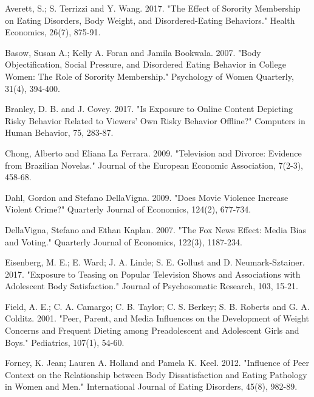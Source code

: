 \documentclass[12pt]{article}
\begin{document}
\begin{thebibliography}{9}
	
	\singlespacing

\item 
Averett, S.; S. Terrizzi and Y. Wang. 2017. "The Effect of Sorority Membership on Eating Disorders, Body Weight, and Disordered-Eating Behaviors." Health Economics, 26(7), 875-91.

\item 
Basow, Susan A.; Kelly A. Foran and Jamila Bookwala. 2007. "Body Objectification, Social Pressure, and Disordered Eating Behavior in College Women: The Role of Sorority Membership." Psychology of Women Quarterly, 31(4), 394-400.

\item 
Branley, D. B. and J. Covey. 2017. "Is Exposure to Online Content Depicting Risky Behavior Related to Viewers' Own Risky Behavior Offline?" Computers in Human Behavior, 75, 283-87.

\item 
Chong, Alberto and Eliana La Ferrara. 2009. "Television and Divorce: Evidence from Brazilian Novelas." Journal of the European Economic Association, 7(2-3), 458-68.

\item 
Dahl, Gordon and Stefano DellaVigna. 2009. "Does Movie Violence Increase Violent Crime?" Quarterly Journal of Economics, 124(2), 677-734.

\item 
DellaVigna, Stefano and Ethan Kaplan. 2007. "The Fox News Effect: Media Bias and Voting." Quarterly Journal of Economics, 122(3), 1187-234.

\item 
Eisenberg, M. E.; E. Ward; J. A. Linde; S. E. Gollust and D. Neumark-Sztainer. 2017. "Exposure to Teasing on Popular Television Shows and Associations with Adolescent Body Satisfaction." Journal of Psychosomatic Research, 103, 15-21.

\item 
Field, A. E.; C. A. Camargo; C. B. Taylor; C. S. Berkey; S. B. Roberts and G. A. Colditz. 2001. "Peer, Parent, and Media Influences on the Development of Weight Concerns and Frequent Dieting among Preadolescent and Adolescent Girls and Boys." Pediatrics, 107(1), 54-60.

\item 
Forney, K. Jean; Lauren A. Holland and Pamela K. Keel. 2012. "Influence of Peer Context on the Relationship between Body Dissatisfaction and Eating Pathology in Women and Men." International Journal of Eating Disorders, 45(8), 982-89.


\end{thebibliography}
\end{document}
